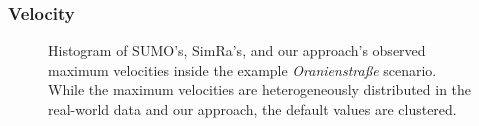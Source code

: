 \subsubsection{Velocity}
\label{subsubsec:velocity_evaluation}
\begin{figure}[t]
    \centering
    \hfill
    \caption{%
        Histogram of SUMO's, SimRa's, and our approach's observed maximum velocities inside the example \textit{Oranienstraße} scenario.
        While the maximum velocities are heterogeneously distributed in the real-world data and our approach, the default values are clustered.
    }%
    \label{fig:eval_velo}
\end{figure}

